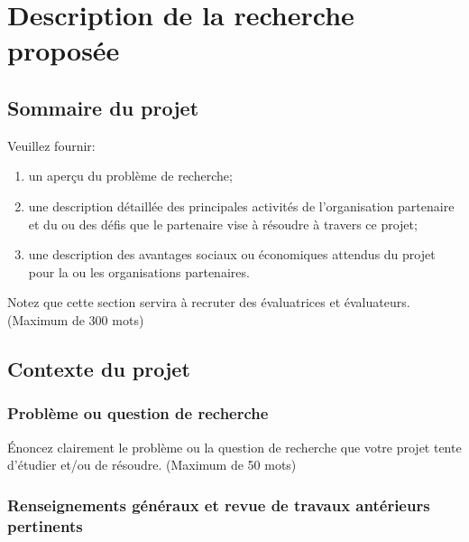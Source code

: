 \documentclass{mitacs-acceleration}
\begin{document}
\phantom{W}

\section{Description de la recherche proposée}

\renewcommand{\thesubsection}{\arabic{section}.\arabic{subsection}}

\subsection{Sommaire du projet}

\begin{instructions}
Veuillez fournir:
\begin{enumerate}[label=\alph*)]
    \item un aperçu du problème de recherche;
    \item une description détaillée des principales activités de l'organisation partenaire et du ou des défis que le partenaire vise à résoudre à travers ce projet; 
    \item une description des avantages sociaux ou économiques attendus du projet pour la ou les organisations partenaires.
\end{enumerate}
Notez que cette section servira à recruter des évaluatrices et évaluateurs. (Maximum de 300 mots)
\end{instructions}

\subsection{Contexte du projet}

\subsubsection{Problème ou question de recherche}

\begin{instructions}
Énoncez clairement le problème ou la question de recherche que votre projet tente d'étudier et/ou de résoudre. (Maximum de 50 mots)
\end{instructions}


\subsubsection{Renseignements généraux et revue de travaux antérieurs pertinents}
\end{document}

